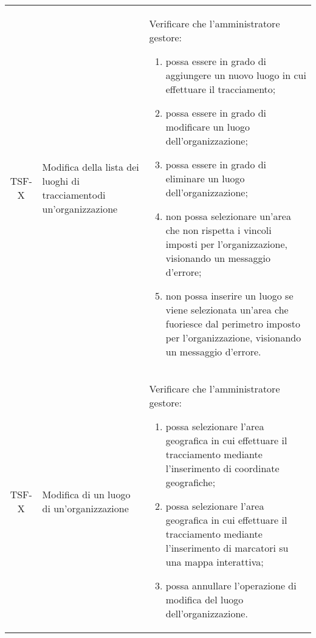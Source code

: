 {\begin{longtable}{ c | C{3cm} | C{11cm} }
TSF-X & Modifica della lista dei luoghi di tracciamentodi un'organizzazione & 
Verificare che l'amministratore gestore:
\begin{enumerate}
    \item possa essere in grado di aggiungere un nuovo luogo in cui effettuare il tracciamento;
    \item possa essere in grado di modificare un luogo dell'organizzazione;
    \item possa essere in grado di eliminare un luogo dell'organizzazione;
    \item non possa selezionare un'area che non rispetta i vincoli imposti per l'organizzazione, visionando un messaggio d'errore;
    \item non possa inserire un luogo se viene selezionata un'area che fuoriesce dal perimetro imposto per l'organizzazione, visionando un messaggio d'errore.
\end{enumerate} \\

TSF-X & Modifica di un luogo di un'organizzazione & 
Verificare che l'amministratore gestore:
\begin{enumerate}
    \item possa selezionare l'area geografica in cui effettuare il tracciamento mediante l'inserimento di coordinate geografiche;
    \item possa selezionare l'area geografica in cui effettuare il tracciamento mediante l'inserimento di marcatori su una mappa interattiva;
    \item possa annullare l'operazione di modifica del luogo dell'organizzazione.
\end{enumerate} \\


\end{longtable}}
